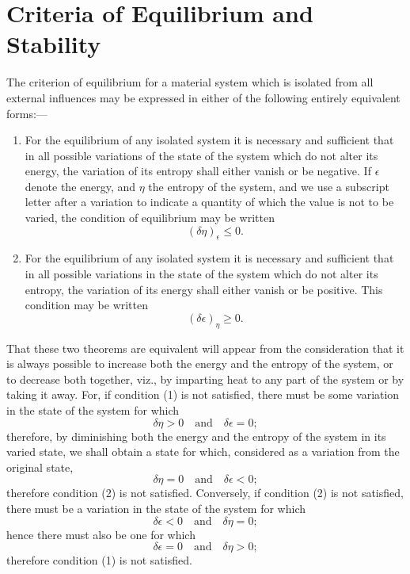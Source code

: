 \documentclass[11pt]{article}
\newcommand{\eps}{\epsilon}
\begin{document}
\section*{Criteria of Equilibrium and Stability}

The criterion of equilibrium for a material system which is isolated from all external influences may be expressed in either of the following entirely equivalent forms:—

\begin{enumerate}[label=\Roman*.]
\item For the equilibrium of any isolated system it is necessary and sufficient that in all possible variations of the state of the system which do not alter its energy, the variation of its entropy shall either vanish or be negative. If \(\eps\) denote the energy, and \(\eta\) the entropy of the system, and we use a subscript letter after a variation to indicate a quantity of which the value is not to be varied, the condition of equilibrium may be written
\begin{equation}
(\delta\eta)_{\eps}\leq 0.
\end{equation}

\item For the equilibrium of any isolated system it is necessary and sufficient that in all possible variations in the state of the system which do not alter its entropy, the variation of its energy shall either vanish or be positive. This condition may be written
\begin{equation}
(\delta\eps)_{\eta}\geq 0.
\end{equation}
\end{enumerate}

That these two theorems are equivalent will appear from the consideration that it is always possible to increase both the energy and the entropy of the system, or to decrease both together, viz., by imparting heat to any part of the system or by taking it away. For, if condition (1) is not satisfied, there must be some variation in the state of the system for which
\[
\delta\eta>0 \quad\text{and}\quad \delta\eps=0;
\]
therefore, by diminishing both the energy and the entropy of the system in its varied state, we shall obtain a state for which, considered as a variation from the original state,
\[
\delta\eta=0 \quad\text{and}\quad \delta\eps<0;
\]
therefore condition (2) is not satisfied. Conversely, if condition (2) is not satisfied, there must be a variation in the state of the system for which
\[
\delta\eps<0 \quad\text{and}\quad \delta\eta=0;
\]
hence there must also be one for which
\[
\delta\eps=0 \quad\text{and}\quad \delta\eta>0;
\]
therefore condition (1) is not satisfied.
\end{document}
